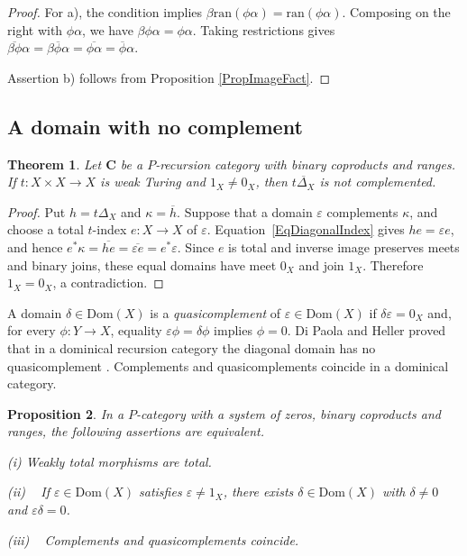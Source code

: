 \documentclass[letterpaper,10pt]{amsart}
\theoremstyle{plain}
\newtheorem{thm}{Theorem}[section]
\newtheorem{prop}[thm]{Proposition}
\theoremstyle{definition}
\newcommand{\rst}[1]{\overline{#1}}
\begin{document}
\begin{proof}
For a), the condition implies $\beta\mathrm{ran}(\phi\alpha)=\mathrm{ran}(\phi\alpha)$. Composing on the right with $\phi\alpha$, we have $\beta\phi\alpha=\phi\alpha$. Taking restrictions gives
$\rst{\beta\phi}\alpha=\rst{\beta\phi\alpha}
=\rst{\phi\alpha}=\rst\phi\alpha$.

Assertion b) follows from Proposition \ref{PropImageFact}. 
\end{proof}

\subsection{A domain with no complement}
\begin{thm}\label{ThmNoncomp}
Let $\mathbf C$ be a $P$-recursion category with binary coproducts
and ranges. If $t:X\times X\to X$ is weak Turing and
$1_X\ne0_X$, then $\rst{t\Delta_X}$ is not complemented.
\end{thm}
\begin{proof}
Put $h=t\Delta_X$ and $\kappa=\rst h$. Suppose that a domain
$\varepsilon$ complements $\kappa$, and choose a total $t$-index
$e:X\to X$ of $\varepsilon$. Equation~\eqref{EqDiagonalIndex}
gives $he=\varepsilon e$, and hence
$e^*\kappa=\rst{he}=\rst{\varepsilon e}=e^*\varepsilon$.
Since $e$ is total and inverse image preserves meets and binary joins,
these equal domains have meet $0_X$ and join $1_X$. Therefore
$1_X=0_X$, a contradiction.
\end{proof}

A domain $\delta\in\mathrm{Dom}(X)$ is a \textit{quasicomplement}
of $\varepsilon\in\mathrm{Dom}(X)$ if $\delta\varepsilon=0_X$ and,
for every $\phi:Y\to X$, equality $\varepsilon\phi=\delta\phi$
implies $\phi=0$.
Di Paola and Heller proved that in a dominical recursion category the
diagonal domain has no quasicomplement
\cite[Corollary~8.6]{MR88i:03078}. Complements and quasicomplements
coincide in a dominical category.

\begin{prop}
In a $P$-category with a system of zeros, binary coproducts and ranges, the following assertions are equivalent.

(i) Weakly total morphisms are total.

(ii) ~\cite[Proposition 5.3]{MR88i:03078} If $\varepsilon\in\mathrm{Dom}(X)$ satisfies $\varepsilon\ne1_X$, there exists $\delta\in\mathrm{Dom}(X)$ with $\delta\ne0$ and $\varepsilon\delta=0$.

(iii) ~\cite[Proposition 7.3]{MR88i:03078} Complements and quasicomplements coincide.
\end{prop}
\end{document}
